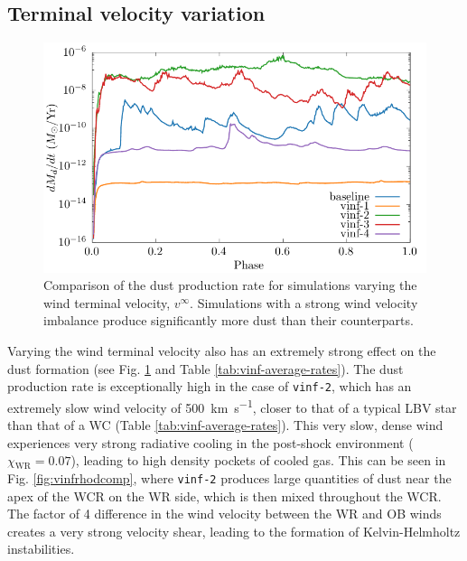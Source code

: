 \documentclass[fleqn,usenatbib]{mnras}
\newcommand{\swr}{\ensuremath{_{\text{WR}}}}
\begin{document}
\subsection{Terminal velocity variation}
\label{sec:paper1vinfresults}

\begin{figure}
  \centering
  \includegraphics[width=\linewidth]{assets/vinf-phase-dust_rate.pdf}
  \caption[Comparison of the dust production rate for simulations varying the wind terminal velocity]{Comparison of the dust production rate for simulations varying the wind terminal velocity, $v^\infty$. Simulations with a strong wind velocity imbalance produce significantly more dust than their counterparts.}
  \label{fig:vinfdustproduction}
\end{figure}

Varying the wind terminal velocity also has an extremely strong effect on the dust formation (see Fig. \ref{fig:vinfdustproduction} and Table \ref{tab:vinf-average-rates}).
The dust production rate is exceptionally high in the case of \texttt{vinf-2}, which has an extremely slow wind velocity of \SI{500}{\kilo\metre\per\second}, closer to that of a typical LBV star than that of a WC (Table \ref{tab:vinf-average-rates}).
This very slow, dense wind experiences very strong radiative cooling in the post-shock environment ($\chi\swr = 0.07$), leading to high density pockets of cooled gas.
This can be seen in Fig. \ref{fig:vinfrhodcomp}, where \texttt{vinf-2} produces large quantities of dust near the apex of the WCR on the WR side, which is then mixed throughout the WCR.
The factor of 4 difference in the wind velocity between the WR and OB winds creates a very strong velocity shear, leading to the formation of Kelvin-Helmholtz instabilities.
\end{document}

